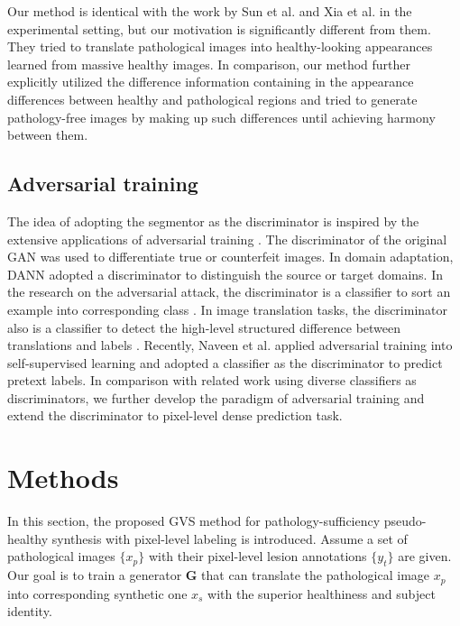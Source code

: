 \documentclass[journal,twoside,web]{ieeecolor}
\begin{document}
Our method is identical with the work by Sun et al. \cite{sun2020adversarial} and Xia et al. \cite{xia2020pseudo} in the experimental setting,  but our motivation is significantly different from them. They tried to translate pathological images into healthy-looking appearances learned from massive healthy images. In comparison, our method further explicitly utilized the difference information containing in the appearance differences between healthy and pathological regions and tried to generate pathology-free images by making up such differences until achieving harmony between them. 

\subsection{Adversarial training}
The idea of adopting the segmentor as the discriminator is inspired by the extensive applications of adversarial training \cite{goodfellow2014generative}. The discriminator of the original GAN was used to differentiate true or counterfeit images. In domain adaptation, DANN \cite{ganin2016domain}  adopted a discriminator to distinguish the source or target domains. In the research on the adversarial attack,  the discriminator is a classifier to sort an example into corresponding class \cite{goodfellow2014explaining,miyato2018virtual}. In image translation tasks, the discriminator also is a classifier to detect the high-level structured difference between translations and labels \cite{isola2017image,zhu2017unpaired}.  Recently, Naveen et al. \cite{minderer2020automatic} applied adversarial training into self-supervised learning and adopted a classifier as the discriminator to predict pretext labels. In comparison with related work using diverse classifiers as discriminators, we further develop the paradigm of adversarial training and extend the discriminator to pixel-level dense prediction task.



\section{Methods}
\label{sec:Methods}
In this section, the proposed GVS method for pathology-sufficiency pseudo-healthy synthesis with pixel-level labeling is introduced. Assume a set of pathological images $\{x_p\}$ with their pixel-level lesion annotations $\{y_t\}$ are given. Our goal is to train a generator $\mathbf{G}$ that can translate the pathological image $x_p$ into corresponding synthetic one $x_s$ with the superior healthiness and subject identity.
\end{document}
